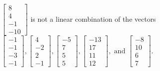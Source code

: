 \begin{exercise}
\begin{exerciseStatement}
  \end{exerciseStatement}
  \begin{exerciseAnswer}
   \(\left[\begin{array}{c}
8 \\
4 \\
-1 \\
-10
\end{array}\right]\) 
  	 is not  
	a linear combination of the vectors \(\left[\begin{array}{c}
-1 \\
-1 \\
-3 \\
-1
\end{array}\right] , \left[\begin{array}{c}
4 \\
-2 \\
2 \\
-1
\end{array}\right] , \left[\begin{array}{c}
-5 \\
7 \\
5 \\
5
\end{array}\right] , \left[\begin{array}{c}
-13 \\
17 \\
11 \\
12
\end{array}\right] , \text{ and } \left[\begin{array}{c}
-8 \\
10 \\
6 \\
7
\end{array}\right]\).

	
  


  \end{exerciseAnswer}
\end{exercise}